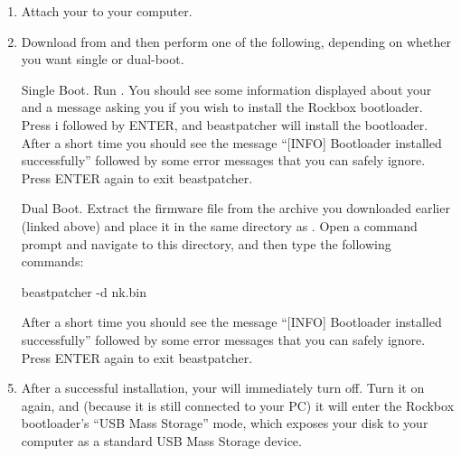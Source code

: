 \begin{enumerate}

\item Attach your \dap{} to your computer.

\item Download  from
and then perform one of the following, depending on whether you want single
or dual-boot.

\item[Single Boot.] Run . You should see some
information displayed about
your \dap{} and a message asking you if you wish to install the Rockbox
bootloader. Press i followed by ENTER, and beastpatcher will
install the bootloader. After a short time you should see the message
``[INFO] Bootloader installed successfully'' followed by some error
messages that you can safely ignore. Press ENTER again to exit
beastpatcher.

\item[Dual Boot.]  Extract the \playerman{} firmware file  from
the archive you downloaded earlier (linked above) and place it in the same
directory as .  Open a command prompt and navigate
to this directory, and then type the following commands:

\begin{code} 
    beastpatcher -d nk.bin
\end{code}

After a short time you should see the message
``[INFO] Bootloader installed successfully'' followed by some error
messages that you can safely ignore. Press ENTER again to exit
beastpatcher.

\item After a successful installation, your \dap{} will immediately turn off.
Turn it on again, and (because it is still connected to your PC)
it will enter the Rockbox bootloader's
``USB Mass Storage'' mode, which exposes your \daps{} disk to your computer
as a standard USB Mass Storage device.
\end{enumerate}

